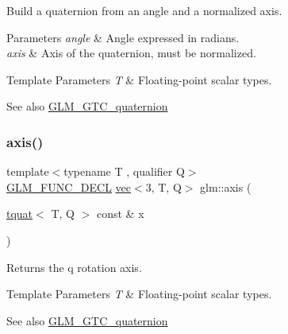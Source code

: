 Build a quaternion from an angle and a normalized axis.


\begin{DoxyParams}{Parameters}
{\em angle} & Angle expressed in radians. \\
\hline
{\em axis} & Axis of the quaternion, must be normalized. \\
\hline
\end{DoxyParams}

\begin{DoxyTemplParams}{Template Parameters}
{\em T} & Floating-\/point scalar types.\\
\hline
\end{DoxyTemplParams}
\begin{DoxySeeAlso}{See also}
\mbox{\hyperlink{group__gtc__quaternion}{G\+L\+M\+\_\+\+G\+T\+C\+\_\+quaternion}} 
\end{DoxySeeAlso}
\mbox{\label{group__gtc__quaternion_gaaf2707d3081789ce097daaa6e54d5287}} 
\subsubsection{\texorpdfstring{axis()}{axis()}}
{\footnotesize\ttfamily template$<$typename T , qualifier Q$>$ \\
\mbox{\hyperlink{setup_8hpp_ab2d052de21a70539923e9bcbf6e83a51}{G\+L\+M\+\_\+\+F\+U\+N\+C\+\_\+\+D\+E\+CL}} \mbox{\hyperlink{structglm_1_1vec}{vec}}$<$3, T, Q$>$ glm\+::axis (\begin{DoxyParamCaption}\item[{\mbox{\hyperlink{structglm_1_1tquat}{tquat}}$<$ T, Q $>$ const \&}]{x }\end{DoxyParamCaption})}

Returns the q rotation axis.


\begin{DoxyTemplParams}{Template Parameters}
{\em T} & Floating-\/point scalar types.\\
\hline
\end{DoxyTemplParams}
\begin{DoxySeeAlso}{See also}
\mbox{\hyperlink{group__gtc__quaternion}{G\+L\+M\+\_\+\+G\+T\+C\+\_\+quaternion}} 
\end{DoxySeeAlso}
\mbox{\label{group__gtc__quaternion_gac40833db608deda477f018767b9a1cad}} 
